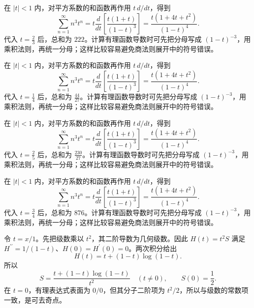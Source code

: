 \documentclass[12pt,fontset=fandol]{ctexart}
\begin{document}
\begin{solve}\label{ans:c27q9}
在 $|t|<1$ 内，对平方系数的和函数再作用 $t\,d/dt$，得到
\[
\sum_{n=1}^\infty n^3t^n=t\frac d{dt}\left[\frac{t(1+t)}{(1-t)^3}\right]=\frac{t(1+4t+t^2)}{(1-t)^4}.
\]
代入 $t=\frac{2}{3}$ 后，总和为 $222$。计算有理函数导数时可先把分母写成 $(1-t)^{-3}$，用乘积法则，再统一分母；这样比较容易避免商法则展开中的符号错误。
\end{solve}

\begin{solve}\label{ans:c27q10}
在 $|t|<1$ 内，对平方系数的和函数再作用 $t\,d/dt$，得到
\[
\sum_{n=1}^\infty n^3t^n=t\frac d{dt}\left[\frac{t(1+t)}{(1-t)^3}\right]=\frac{t(1+4t+t^2)}{(1-t)^4}.
\]
代入 $t=\frac{1}{4}$ 后，总和为 $\frac{44}{27}$。计算有理函数导数时可先把分母写成 $(1-t)^{-3}$，用乘积法则，再统一分母；这样比较容易避免商法则展开中的符号错误。
\end{solve}

\begin{solve}\label{ans:c27q11}
在 $|t|<1$ 内，对平方系数的和函数再作用 $t\,d/dt$，得到
\[
\sum_{n=1}^\infty n^3t^n=t\frac d{dt}\left[\frac{t(1+t)}{(1-t)^3}\right]=\frac{t(1+4t+t^2)}{(1-t)^4}.
\]
代入 $t=\frac{2}{5}$ 后，总和为 $\frac{230}{27}$。计算有理函数导数时可先把分母写成 $(1-t)^{-3}$，用乘积法则，再统一分母；这样比较容易避免商法则展开中的符号错误。
\end{solve}

\begin{solve}\label{ans:c27q12}
在 $|t|<1$ 内，对平方系数的和函数再作用 $t\,d/dt$，得到
\[
\sum_{n=1}^\infty n^3t^n=t\frac d{dt}\left[\frac{t(1+t)}{(1-t)^3}\right]=\frac{t(1+4t+t^2)}{(1-t)^4}.
\]
代入 $t=\frac{3}{4}$ 后，总和为 $876$。计算有理函数导数时可先把分母写成 $(1-t)^{-3}$，用乘积法则，再统一分母；这样比较容易避免商法则展开中的符号错误。
\end{solve}

\begin{solve}\label{ans:c27q13}
令 $t=x/1$。先把级数乘以 $t^2$，其二阶导数为几何级数。因此 $H(t)=t^2S$ 满足 $H^{\prime\prime}=1/(1-t)$、$H(0)=H^{\prime}(0)=0$。两次积分给出
\[
H(t)=t+(1-t)\log(1-t).
\]
所以
\[
S=\frac{t+(1-t)\log(1-t)}{t^2}\quad(t\ne0),\qquad S(0)=\frac12.
\]
在 $t=0$，有理表达式表面为 $0/0$，但其分子二阶项为 $t^2/2$，所以与级数的常数项一致，是可去奇点。
\end{solve}
\end{document}

